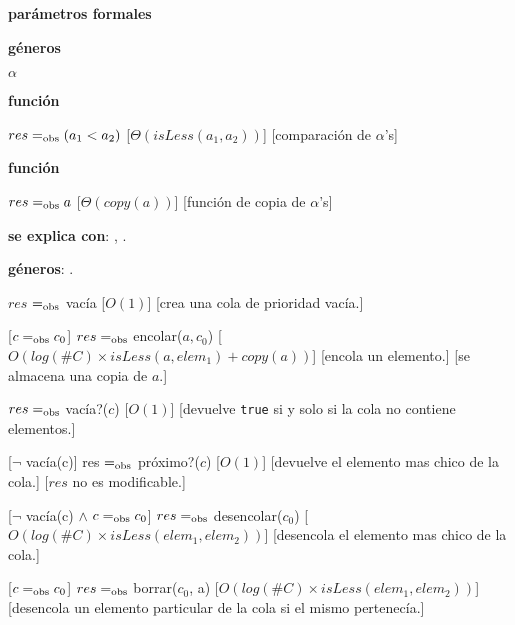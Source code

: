 \begin{Interfaz}

	\textbf{parámetros formales}\parindent\\
	\parbox{1.7cm}{\textbf{géneros}}$\alpha$\\
	\parbox[t]{1.7cm}{\textbf{función}}\parbox[t]{.5\textwidth-\parindent-1.7cm}{
		{$res =_{\mathrm{obs}} (a_1 < a_2)$}
		[$\Theta(isLess(a_1, a_2))$]
		[comparación de $\alpha$'s]
	}
	\parbox[t]{1.7cm}{\textbf{función}}\parbox[t]{.5\textwidth-\parindent-1.7cm}{
		{$res =_{\mathrm{obs}} a$}
		[$\Theta(copy(a))$]
		[función de copia de $\alpha$'s]
	}

	\textbf{se explica con}: , .

	\textbf{géneros}: .


	{$res$ $=_{\mathrm{obs}}$ vacía}
	[$O(1)$]
	[crea una cola de prioridad vacía.]

	[$c =_{\mathrm{obs}} c_0$]
	{$res =_{\mathrm{obs}}$ encolar($a, c_0$)}
	[$O(log(\#C) \times isLess(a, elem_1) + copy(a))$]
	[encola un elemento.]
	[se almacena una copia de $a$.]

	{$res =_{\mathrm{obs}}$ vacía?($c$)}
	[$O(1)$]
	[devuelve \texttt{true} si y solo si la cola no contiene elementos.]

	[$\neg$ vacía(c)]
	{res $=_{\mathrm{obs}}$ próximo?($c$)}
	[$O(1)$]
	[devuelve el elemento mas chico de la cola.]
	[$res$ no es modificable.]

	[$\neg$ vacía(c) $\land$ $c =_{\mathrm{obs}} c_0$]
	{$res =_{\mathrm{obs}}$ desencolar($c_0$)}
	[$O(log(\#C) \times isLess(elem_1, elem_2))$]
	[desencola el elemento mas chico de la cola.]

	[$c =_{\mathrm{obs}} c_0$]
	{$res =_{\mathrm{obs}}$ borrar($c_0$, a)}
	[$O(log(\#C) \times isLess(elem_1, elem_2))$]
	[desencola un elemento particular de la cola si el mismo pertenecía.]


\end{Interfaz}
